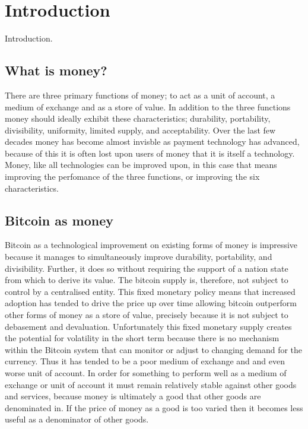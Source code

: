 \section{Introduction}

Introduction. \\

\subsection{What is money?}

There are three primary functions of money; to act as a unit of account, a medium of exchange and as a store of value. In addition to the three functions money should ideally exhibit these characteristics; durability, portability, divisibility, uniformity, limited supply, and acceptability. Over the last few decades money has become almost invisble as payment technology has advanced, because of this it is often lost upon users of money that it is itself a technology. Money, like all technologies can be improved upon, in this case that means improving the perfomance of the three functions, or improving the six characteristics.

\subsection{Bitcoin as money}

Bitcoin as a technological improvement on existing forms of money is impressive because it manages to simultaneously improve durability, portability, and divisibility. Further, it does so without requiring the support of a nation state from which to derive its value. The bitcoin supply is, therefore,  not subject to control by a centralised entity. This fixed monetary policy means that increased adoption has tended to drive the price up over time allowing bitcoin outperform other forms of money as a store of value, precisely because it is not subject to debasement and devaluation. Unfortunately this fixed monetary supply creates the potential for volatility in the short term because there is no mechanism within the Bitcoin system that can monitor or adjust to changing demand for the currency. Thus it has tended to be a poor medium of exchange and and even worse unit of account. In order for something to perform well as a medium of exchange or unit of account it must remain relatively stable against other goods and services, because money is ultimately a good that other goods are denominated in. If the price of money as a good is too varied then it becomes less useful as a denominator of other goods. \\

